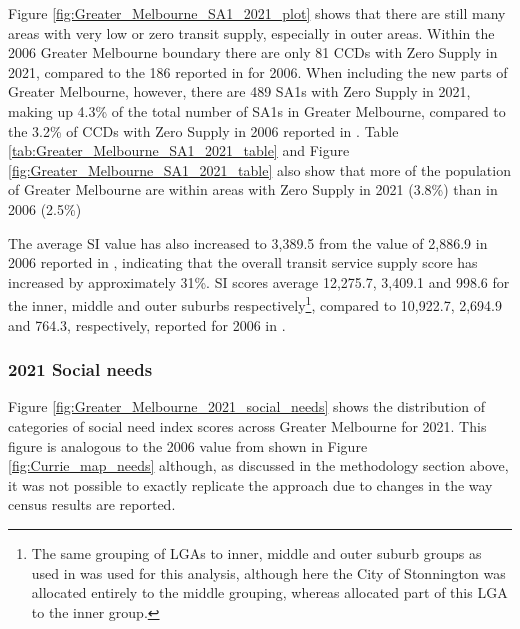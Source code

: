 \documentclass[preprint, 3p,
authoryear]{elsarticle} %
\begin{document}
Figure \ref{fig:Greater_Melbourne_SA1_2021_plot} shows that there are
still many areas with very low or zero transit supply, especially in
outer areas. Within the 2006 Greater Melbourne boundary there are only
81 CCDs with Zero Supply in 2021, compared to the 186 reported in
\citet{currie2010identifying} for 2006. When including the new parts of
Greater Melbourne, however, there are 489 SA1s with Zero Supply in 2021,
making up 4.3\% of the total number of SA1s in Greater Melbourne,
compared to the 3.2\% of CCDs with Zero Supply in 2006 reported in
\citet{currie2010identifying}. Table
\ref{tab:Greater_Melbourne_SA1_2021_table} and Figure
\ref{fig:Greater_Melbourne_SA1_2021_table} also show that more of the
population of Greater Melbourne are within areas with Zero Supply in
2021 (3.8\%) than in 2006 (2.5\%)

The average SI value has also increased to 3,389.5 from the value of
2,886.9 in 2006 reported in \citet{currie2010identifying}, indicating
that the overall transit service supply score has increased by
approximately 31\%. SI scores average 12,275.7, 3,409.1 and 998.6 for
the inner, middle and outer suburbs respectively\footnote{The same
  grouping of LGAs to inner, middle and outer suburb groups as used in
  \citet{currie2010identifying} was used for this analysis, although
  here the City of Stonnington was allocated entirely to the middle
  grouping, whereas \citet{currie2010identifying} allocated part of this
  LGA to the inner group.}, compared to 10,922.7, 2,694.9 and 764.3,
respectively, reported for 2006 in \citet{currie2010identifying}.

\subsubsection{2021 Social needs}\label{social-needs}

Figure \ref{fig:Greater_Melbourne_2021_social_needs} shows the
distribution of categories of social need index scores across Greater
Melbourne for 2021. This figure is analogous to the 2006 value from
\citet{currie2010identifying} shown in Figure \ref{fig:Currie_map_needs}
although, as discussed in the methodology section above, it was not
possible to exactly replicate the \citet{currie2010identifying} approach
due to changes in the way census results are reported.
\end{document}
